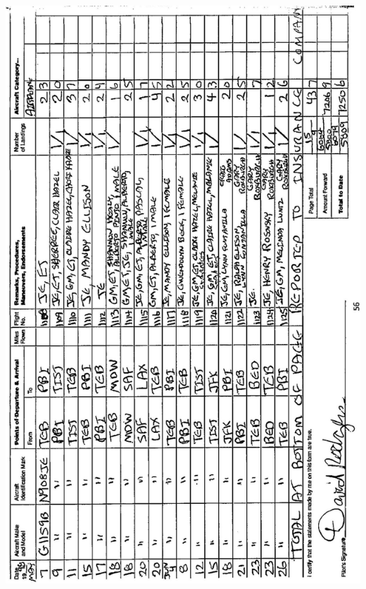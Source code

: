 \documentclass[10pt]{article}
\begin{document}
\includegraphics[max width=\textwidth, center]{2025_02_27_dd68c3d38de88f0516d9g-060}
\end{document}
